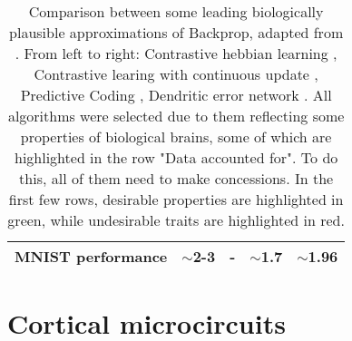{\begin{table}[t]
{\begin{tabular}{|ll|ll|ll|}
        \multicolumn{2}{|l|}{\cellcolor[HTML]{D9D9D9}MNIST performance}                                                 &
        \multicolumn{1}{l|}{\cellcolor[HTML]{D9D9D9}$\sim$2-3}                                                          & -                                                                                &
        \multicolumn{1}{l|}{\cellcolor[HTML]{D9D9D9}$\sim$1.7}                                                          & $\sim$1.96                                                                                                                                                 \\ \hline
      \end{tabular}%
    }\caption{ Comparison between some leading biologically plausible approximations of Backprop, adapted from
      \cite{whittington2019theories}. From left to right: Contrastive hebbian learning \citep{OReilly1996},
      Contrastive learing with continuous update \citep{Bengio2017}, Predictive Coding
      \citep{Whittington2017,rao1999predictive}, Dendritic error network \citep{sacramento2018dendritic}. All
      algorithms were selected due to them reflecting some properties of biological brains, some of which are
      highlighted in the row "Data accounted for". To do this, all of them need to make concessions. In the first few
      rows, desirable properties are highlighted in green, while undesirable traits are highlighted in red.}
  \end{table}

}

\section{Cortical microcircuits}
